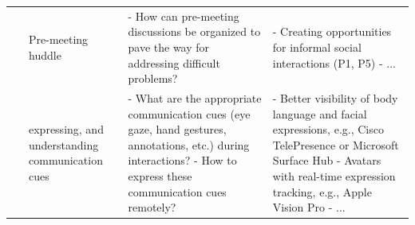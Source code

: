 \documentclass[11pt]{article}
\begin{document}
\begin{table}[ht]
\begin{tabular}{|l|p{3.2cm}|p{4.5cm}|p{4.5cm}|}
{~}& Pre-meeting huddle 
& - How can pre-meeting discussions be organized to pave the way for addressing difficult problems?
& - Creating opportunities for informal social interactions (P1, P5) \newline
- ... \newline {~}\\

{~} & expressing, and understanding communication cues 
& - What are the appropriate communication cues (eye gaze, hand gestures, annotations, etc.) during interactions? \newline
- How to express these communication cues remotely?
& - Better visibility of body language and facial expressions, e.g., Cisco TelePresence or Microsoft Surface Hub \newline
- Avatars with real-time expression tracking, e.g., Apple Vision Pro \newline
- ... \newline {~}\\
\hline

\end{tabular}
\end{table}
\end{document}
